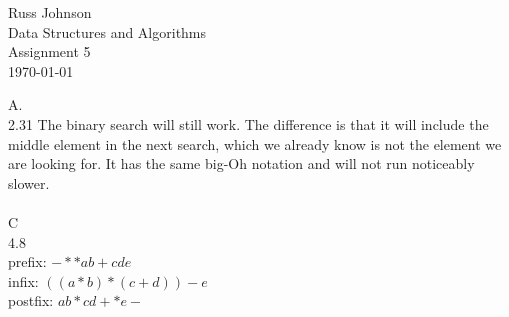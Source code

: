 \documentclass[11pt,a4paper]{article}
\begin{document}
\lstset{language=C++,
basicstyle=\small\ttfamily,
xleftmargin=-2cm,
tabsize=4,
showspaces=false,
showstringspaces=false}

\begin{flushright}
Russ Johnson\\
Data Structures and Algorithms\\
Assignment 5\\
\today\\
\end{flushright}
A.\\
2.31 The binary search will still work. The difference is that it will include the middle element in the next search, which we already know is not the element we are looking for. It has the same big-Oh notation and will not run noticeably slower.\\
~\\
C\\
4.8\\
prefix: $- * * a b + c d e$\\
infix: $((a*b)*(c+d)) - e$\\
postfix: $a b * c d + * e -$\\
\newpage

	\addtolength{\topmargin}{-1in}
    \addtolength{\textheight}{3in}
\end{document}
